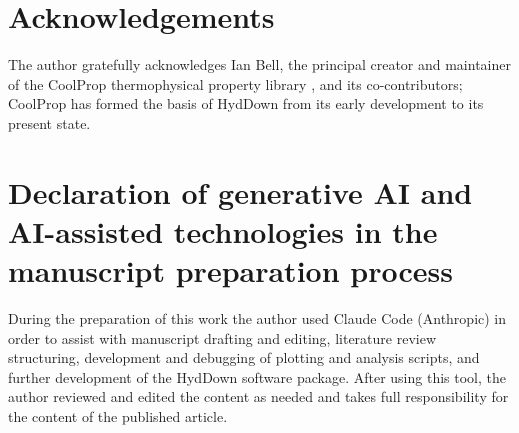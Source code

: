 \documentclass[5p,authoryear]{elsarticle}
\begin{document}
\section*{Acknowledgements}
The author gratefully acknowledges Ian Bell, the principal creator and maintainer of the CoolProp
thermophysical property library \citep{Bell2014}, and its co-contributors; CoolProp has formed the
basis of HydDown from its early development to its present state.

\section*{Declaration of generative AI and AI-assisted technologies in the manuscript preparation process}
During the preparation of this work the author used Claude Code (Anthropic) in order to assist with
manuscript drafting and editing, literature review structuring, development and debugging of
plotting and analysis scripts, and further development of the HydDown software package. After using
this tool, the author reviewed and edited the content as needed and takes full responsibility for
the content of the published article.

\end{document}

